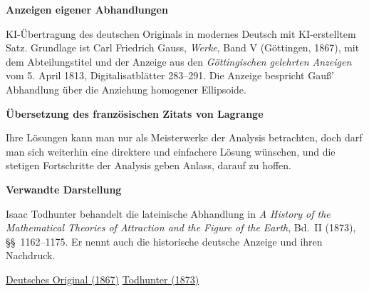 \clearpage
\thispagestyle{empty}
\begin{center}\Large\textbf{Anzeigen eigener Abhandlungen}\end{center}

KI-Übertragung des deutschen Originals in modernes Deutsch mit KI-erstelltem Satz. Grundlage ist Carl Friedrich Gauss, \textit{Werke}, Band V (Göttingen, 1867), mit dem Abteilungstitel und der Anzeige aus den \textit{Göttingischen gelehrten Anzeigen} vom 5. April 1813, Digitalisatblätter 283--291. Die Anzeige bespricht Gauß’ Abhandlung über die Anziehung homogener Ellipsoide.

\noindent\textbf{Übersetzung des französischen Zitats von Lagrange}\par\smallskip
\noindent Ihre Lösungen kann man nur als Meisterwerke der Analysis betrachten, doch darf man sich weiterhin eine direktere und einfachere Lösung wünschen, und die stetigen Fortschritte der Analysis geben Anlass, darauf zu hoffen.

\medskip\noindent\textbf{Verwandte Darstellung}\par\smallskip
\noindent Isaac Todhunter behandelt die lateinische Abhandlung in \textit{A History of the Mathematical Theories of Attraction and the Figure of the Earth}, Bd.~II (1873), §§~1162--1175. Er nennt auch die historische deutsche Anzeige und ihren Nachdruck.

\medskip\noindent\href{https://gdz.sub.uni-goettingen.de/id/PPN236006339}{Deutsches Original (1867)}\quad
\href{https://www.gutenberg.org/ebooks/69832}{Todhunter (1873)}
\clearpage
